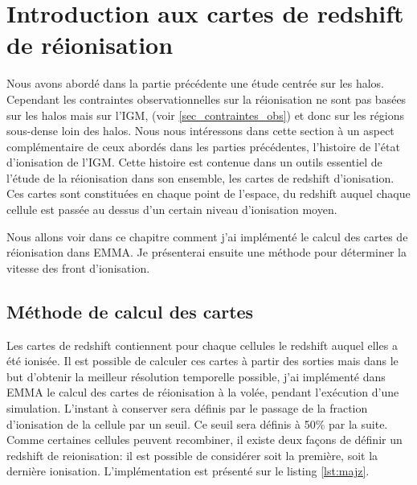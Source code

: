 \chapter{Introduction aux cartes de redshift de réionisation}
\label{sec:intre:zreio}
Nous avons abordé dans la partie précédente une étude centrée sur les halos.
Cependant les contraintes observationnelles sur la réionisation ne sont pas basées sur les halos mais sur l'\ac{IGM}, (voir \ref{sec_contraintes_obs}) et donc sur les régions sous-dense loin des halos.
Nous nous intéressons dans cette section à un aspect complémentaire de ceux abordés dans les parties précédentes, l'histoire de l'état d'ionisation de l'\ac{IGM}.
Cette histoire est contenue dans un outils essentiel de l'étude de la réionisation dans son ensemble, les cartes de redshift d'ionisation.
Ces cartes sont constituées en chaque point de l'espace, du redshift auquel chaque cellule est passée au dessus d'un certain niveau d'ionisation moyen.

Nous allons voir dans ce chapitre comment j'ai implémenté le calcul des cartes de réionisation dans EMMA.
Je présenterai ensuite une méthode pour déterminer la vitesse des front d’ionisation.


\section{Méthode de calcul des cartes}
\label{sec:zmapcompute}

Les cartes de redshift contiennent pour chaque cellules le redshift auquel elles a été ionisée.
Il est possible de calculer ces cartes à partir des sorties mais dans le but d'obtenir la meilleur résolution temporelle possible, j'ai implémenté dans EMMA le calcul des cartes de réionisation à la volée, pendant l'exécution d'une simulation.
L'instant à conserver sera définis par le passage de la fraction d'ionisation de la cellule par un seuil.
Ce seuil sera définis à  50\% par la suite.
Comme certaines cellules peuvent recombiner, il existe deux façons de définir un redshift de reionisation: il est possible de considérer soit la première, soit la dernière ionisation.
L'implémentation est présenté sur le listing \ref{lst:majz}.

